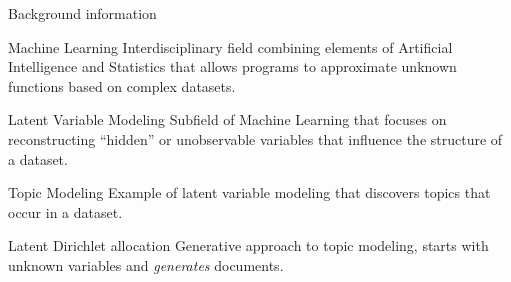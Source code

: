 \begin{frame}{Background information}

  \onslide<+->
  \begin{block}{Machine Learning}
    Interdisciplinary field combining
    elements of Artificial Intelligence and Statistics that allows
    programs to approximate unknown functions based on complex datasets.
  \end{block}

  \onslide<+->
  \begin{block}{Latent Variable Modeling}
    Subfield of Machine Learning that focuses on reconstructing
    ``hidden'' or unobservable variables that influence the structure of
    a dataset.
  \end{block}

  \onslide<+->
  \begin{block}{Topic Modeling}
    Example of latent variable modeling that discovers \alert{topics}
    that occur in a dataset.
  \end{block}

  \onslide<+->
  \begin{block}{Latent Dirichlet allocation}
    Generative approach to topic modeling, starts with unknown variables
    and \emph{generates} documents.
  \end{block}
\end{frame}
